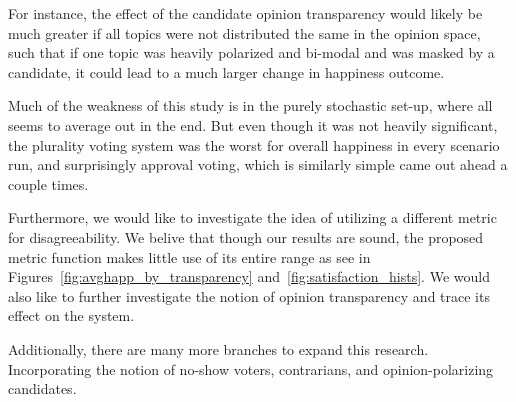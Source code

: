 For instance, the effect of the candidate opinion transparency would likely be much greater if all topics were not distributed the same in the opinion space, such that if one topic was heavily polarized and bi-modal and was masked by a candidate, it could lead to a much larger change in happiness outcome.

Much of the weakness of this study is in the purely stochastic set-up, where all seems to average out in the end.
But even though it was not heavily significant, the plurality voting system was the worst for overall happiness in every scenario run, and surprisingly approval voting, which is similarly simple came out ahead a couple times.

Furthermore, we would like to investigate the idea of utilizing a different metric for disagreeability. We belive that though our results are sound, the proposed metric function makes little use of its entire range as see in 
Figures~\ref{fig:avghapp_by_transparency} and~\ref{fig:satisfaction_hists}. We would also like to further investigate the notion 
of opinion transparency and trace its effect on the system.

Additionally, there are many more branches to expand this research. Incorporating the notion of no-show voters, contrarians, 
and opinion-polarizing candidates.
